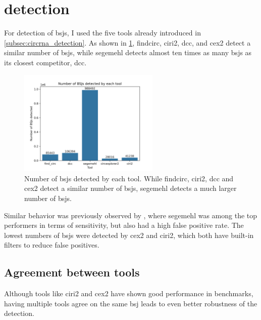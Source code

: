 \section{ detection}

For detection of \glspl{bsj}, I used the five tools already introduced in
\cref{subsec:circrna_detection}.
As shown in \cref{fig:detection_bars}, \gls{findcirc}, \gls{ciri2}, \gls{dcc},
and \gls{cex2} detect a similar number of \glspl{bsj}, while \gls{segemehl}
detects almost ten times as many \glspl{bsj} as its closest competitor,
\gls{dcc}.

\begin{figure}[H] \centering

    \includegraphics[width=0.6\textwidth]{chapters/4_results_and_discussion/figures/detection/n_bsjs_detected.png}
    \caption{Number of \glspl{bsj} detected by each tool.
        While \gls{findcirc}, \gls{ciri2}, \gls{dcc} and \gls{cex2} detect a similar
        number of \glspl{bsj}, \gls{segemehl} detects a much larger number of
        \glspl{bsj}.
    }
    \label{fig:detection_bars}
\end{figure}
Similar behavior was previously observed by \textcite{zeng_comprehensive_2017},
where \gls{segemehl} was among the top performers in terms of sensitivity, but
also had a high false positive rate.
The lowest numbers of \glspl{bsj} were detected by \gls{cex2} and \gls{ciri2},
which both have built-in filters to reduce false
positives\supercite{zhang_diverse_2016,gao_circular_2018}.

\subsection{Agreement between tools}

Although tools like \gls{ciri2} and \gls{cex2} have shown good performance in
benchmarks\supercite{zeng_comprehensive_2017}, having multiple tools agree on
the same \gls{bsj} leads to even better robustness of the
detection\supercite{hansen_comparison_2016}.

